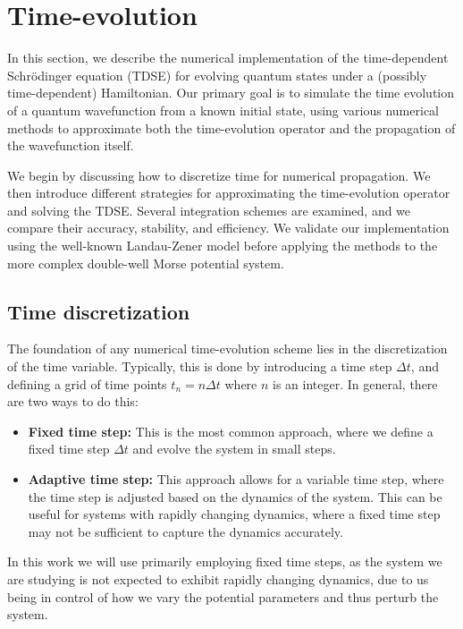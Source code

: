\documentclass{subfiles}
\begin{document}
\section{Time-evolution}
In this section, we describe the numerical implementation of the time-dependent Schrödinger equation (TDSE) for evolving quantum states under a (possibly time-dependent) Hamiltonian. Our primary goal is to simulate the time evolution of a quantum wavefunction from a known initial state, using various numerical methods to approximate both the time-evolution operator and the propagation of the wavefunction itself.

We begin by discussing how to discretize time for numerical propagation. We then introduce different strategies for approximating the time-evolution operator and solving the TDSE. Several integration schemes are examined, and we compare their accuracy, stability, and efficiency. We validate our implementation using the well-known Landau-Zener model before applying the methods to the more complex double-well Morse potential system.

\subsection{Time discretization}
The foundation of any numerical time-evolution scheme lies in the discretization of the time variable. Typically, this is done by introducing a time step $\Delta t$, and defining a grid of time points $t_n = n \Delta t$ where $n$ is an integer. In general, there are two ways to do this:
\begin{itemize}
    \item \textbf{Fixed time step:} This is the most common approach, where we define a fixed time step $\Delta t$ and evolve the system in small steps. 
    \item \textbf{Adaptive time step:} This approach allows for a variable time step, where the time step is adjusted based on the dynamics of the system. This can be useful for systems with rapidly changing dynamics, where a fixed time step may not be sufficient to capture the dynamics accurately.
\end{itemize}
In this work we will use primarily employing fixed time steps, as the system we are studying is not expected to exhibit rapidly changing dynamics, due to us being in control of how we vary the potential parameters and thus perturb the system. 
\end{document}
